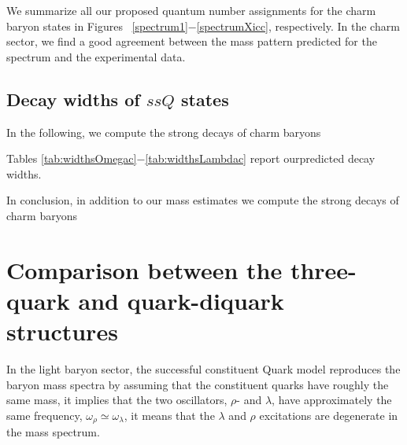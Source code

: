 \documentclass[twocolumn,superscriptaddress,preprintnumbers,nofootinbib]{revtex4}
\begin{document}


We summarize all our proposed quantum number assignments for the charm baryon states in Figures ~\ref{spectrum1}$-$\ref{spectrumXicc}, respectively. In the charm sector, we find a good agreement between the mass pattern predicted  for the spectrum and the experimental data.


\subsection{Decay widths of $ssQ$ states}
\label{secIIC}
In the following, we  compute the strong decays of charm baryons
  


Tables \ref{tab:widthsOmegac}$-$\ref{tab:widthsLambdac} report ourpredicted decay widths.



In conclusion, in addition to our mass estimates we compute the strong decays of charm baryons



\section{Comparison between the three-quark and  quark-diquark structures}
\label{qD}
 In the light baryon sector,  the successful constituent Quark model  reproduces the baryon mass spectra by assuming that   the  constituent quarks have roughly the same mass, it implies that the two oscillators, $\rho$- and $\lambda$, have approximately the same frequency, $\omega_{\rho}\simeq \omega_{\lambda}$, 
it means that the $\lambda$ and $\rho$ excitations are degenerate in the mass spectrum. 
\end{document}
